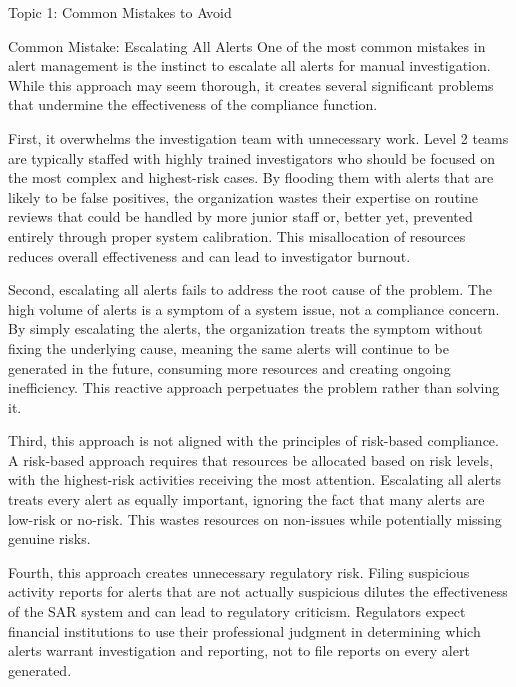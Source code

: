 \documentclass[5pt]{beamer}
\begin{document}
	\begin{frame}{Topic 1: Common Mistakes to Avoid}
		\begin{block}{\tiny Common Mistake: Escalating All Alerts}
			\tiny One of the most common mistakes in alert management is the instinct to escalate all alerts for manual investigation. While this approach may seem thorough, it creates several significant problems that undermine the effectiveness of the compliance function.
			
			First, it overwhelms the investigation team with unnecessary work. Level 2 teams are typically staffed with highly trained investigators who should be focused on the most complex and highest-risk cases. By flooding them with alerts that are likely to be false positives, the organization wastes their expertise on routine reviews that could be handled by more junior staff or, better yet, prevented entirely through proper system calibration. This misallocation of resources reduces overall effectiveness and can lead to investigator burnout.
			
			Second, escalating all alerts fails to address the root cause of the problem. The high volume of alerts is a symptom of a system issue, not a compliance concern. By simply escalating the alerts, the organization treats the symptom without fixing the underlying cause, meaning the same alerts will continue to be generated in the future, consuming more resources and creating ongoing inefficiency. This reactive approach perpetuates the problem rather than solving it.
			
			Third, this approach is not aligned with the principles of risk-based compliance. A risk-based approach requires that resources be allocated based on risk levels, with the highest-risk activities receiving the most attention. Escalating all alerts treats every alert as equally important, ignoring the fact that many alerts are low-risk or no-risk. This wastes resources on non-issues while potentially missing genuine risks.
			
			Fourth, this approach creates unnecessary regulatory risk. Filing suspicious activity reports for alerts that are not actually suspicious dilutes the effectiveness of the SAR system and can lead to regulatory criticism. Regulators expect financial institutions to use their professional judgment in determining which alerts warrant investigation and reporting, not to file reports on every alert generated.
		\end{block}
	\end{frame}
	
\end{document}
